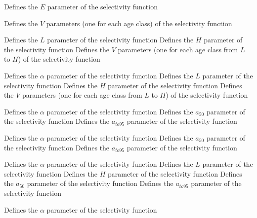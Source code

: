  {Defines the $E$ parameter of the selectivity function}
\par\textbf{}\par
{} {Defines the $V$ parameters (one for each age class) of the selectivity function}
\par\textbf{}\par
{} {Defines the $L$ parameter of the selectivity function}
 {Defines the $H$ parameter of the selectivity function}
 {Defines the $V$ parameters (one for each age class from $L$ to $H$) of the selectivity function}
\par\textbf{}\par
{} {Defines the $\alpha$ parameter of the selectivity function}
 {Defines the $L$ parameter of the selectivity function}
 {Defines the $H$ parameter of the selectivity function}
 {Defines the $V$ parameters (one for each age class from $L$ to $H$) of the selectivity function}
\par\textbf{}\par
{} {Defines the $\alpha$ parameter of the selectivity function}
 {Defines the $a_{50}$ parameter of the selectivity function}
 {Defines the $a_{to95}$ parameter of the selectivity function}
\par\textbf{}\par
{} {Defines the $\alpha$ parameter of the selectivity function}
 {Defines the $a_{50}$ parameter of the selectivity function}
 {Defines the $a_{to95}$ parameter of the selectivity function}
\par\textbf{}\par
{} {Defines the $\alpha$ parameter of the selectivity function}
 {Defines the $L$ parameter of the selectivity function}
 {Defines the $H$ parameter of the selectivity function}
 {Defines the $a_{50}$ parameter of the selectivity function}
 {Defines the $a_{to95}$ parameter of the selectivity function}
\par\textbf{}\par
{} {Defines the $\alpha$ parameter of the selectivity function}

